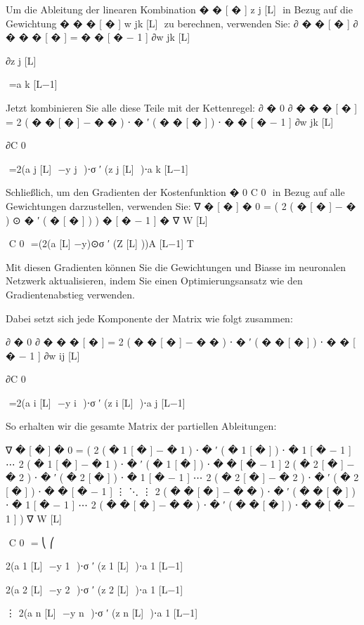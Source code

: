 Um die Ableitung der linearen Kombination 
�
�
[
�
]
z 
j
[L]
​
  in Bezug auf die Gewichtung 
�
�
�
[
�
]
w 
jk
[L]
​
  zu berechnen, verwenden Sie:
∂
�
�
[
�
]
∂
�
�
�
[
�
]
=
�
�
[
�
−
1
]
∂w 
jk
[L]
​
 
∂z 
j
[L]
​
 
​
 =a 
k
[L−1]
​
 

Jetzt kombinieren Sie alle diese Teile mit der Kettenregel:
∂
�
0
∂
�
�
�
[
�
]
=
2
(
�
�
[
�
]
−
�
�
)
⋅
�
′
(
�
�
[
�
]
)
⋅
�
�
[
�
−
1
]
∂w 
jk
[L]
​
 
∂C 
0
​
 
​
 =2(a 
j
[L]
​
 −y 
j
​
 )⋅σ 
′
 (z 
j
[L]
​
 )⋅a 
k
[L−1]
​
 

Schließlich, um den Gradienten der Kostenfunktion 
�
0
C 
0
​
  in Bezug auf alle Gewichtungen darzustellen, verwenden Sie:
∇
�
[
�
]
�
0
=
(
2
(
�
[
�
]
−
�
)
⊙
�
′
(
�
[
�
]
)
)
�
[
�
−
1
]
�
∇ 
W 
[L]
 
​
 C 
0
​
 =(2(a 
[L]
 −y)⊙σ 
′
 (Z 
[L]
 ))A 
[L−1] 
T
 
 

Mit diesen Gradienten können Sie die Gewichtungen und Biasse im neuronalen Netzwerk aktualisieren, indem Sie einen Optimierungsansatz wie den Gradientenabstieg verwenden.


Dabei setzt sich jede Komponente der Matrix wie folgt zusammen:

∂
�
0
∂
�
�
�
[
�
]
=
2
(
�
�
[
�
]
−
�
�
)
⋅
�
′
(
�
�
[
�
]
)
⋅
�
�
[
�
−
1
]
∂w 
ij
[L]
​
 
∂C 
0
​
 
​
 =2(a 
i
[L]
​
 −y 
i
​
 )⋅σ 
′
 (z 
i
[L]
​
 )⋅a 
j
[L−1]
​
 

So erhalten wir die gesamte Matrix der partiellen Ableitungen:

∇
�
[
�
]
�
0
=
(
2
(
�
1
[
�
]
−
�
1
)
⋅
�
′
(
�
1
[
�
]
)
⋅
�
1
[
�
−
1
]
⋯
2
(
�
1
[
�
]
−
�
1
)
⋅
�
′
(
�
1
[
�
]
)
⋅
�
�
[
�
−
1
]
2
(
�
2
[
�
]
−
�
2
)
⋅
�
′
(
�
2
[
�
]
)
⋅
�
1
[
�
−
1
]
⋯
2
(
�
2
[
�
]
−
�
2
)
⋅
�
′
(
�
2
[
�
]
)
⋅
�
�
[
�
−
1
]
⋮
⋱
⋮
2
(
�
�
[
�
]
−
�
�
)
⋅
�
′
(
�
�
[
�
]
)
⋅
�
1
[
�
−
1
]
⋯
2
(
�
�
[
�
]
−
�
�
)
⋅
�
′
(
�
�
[
�
]
)
⋅
�
�
[
�
−
1
]
)
∇ 
W 
[L]
 
​
 C 
0
​
 = 
⎝
⎛
​
  
2(a 
1
[L]
​
 −y 
1
​
 )⋅σ 
′
 (z 
1
[L]
​
 )⋅a 
1
[L−1]
​
 
2(a 
2
[L]
​
 −y 
2
​
 )⋅σ 
′
 (z 
2
[L]
​
 )⋅a 
1
[L−1]
​
 
⋮
2(a 
n
[L]
​
 −y 
n
​
 )⋅σ 
′
 (z 
n
[L]
​
 )⋅a 
1
[L−1]
​
 
